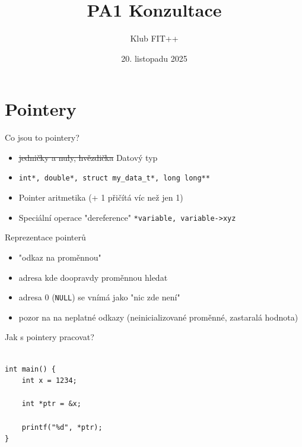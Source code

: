 \documentclass{beamer}
\title{PA1 Konzultace}
\author{Klub FIT++}
\date{20. listopadu 2025}
\begin{document}
\maketitle

\section{Pointery}

\begin{frame}{Co jsou to pointery?}

\begin{itemize}
    \item \sout{jedničky a nuly, hvězdička} Datový typ
    \item \texttt{int*, double*, struct my\_data\_t*, long long**}
    \item Pointer aritmetika (+ 1 přičítá víc než jen 1)
    \item Speciální operace "dereference" \texttt{*variable, variable->xyz}
\end{itemize}
    
\end{frame}

\begin{frame}{Reprezentace pointerů}

\begin{itemize}
    \item "odkaz na proměnnou"
    \item adresa kde doopravdy proměnnou hledat
    \item adresa $0$ (\texttt{NULL}) se vnímá jako "nic zde není"
    \item pozor na na neplatné odkazy (neinicializované proměnné, zastaralá hodnota)
\end{itemize}

\end{frame}

\begin{frame}[fragile]{Jak s pointery pracovat?}

\begin{verbatim}

int main() {
    int x = 1234;

    int *ptr = &x;

    printf("%d", *ptr);
}

\end{verbatim}
    
\end{frame}
\end{document}
